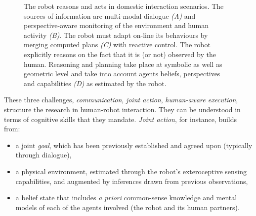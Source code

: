 \documentclass[preprint,3p,times]{elsarticle}
\begin{document}
\begin{figure}[htb]
\centering
{}

\caption{The robot reasons and acts in domestic interaction scenarios.  The
    sources of information are multi-modal dialogue {\it (A)} and
    perspective-aware monitoring of the environment and human activity {\it
    (B)}. The robot must adapt on-line its behaviours by merging computed plans
    {\it (C)} with reactive control. The robot explicitly reasons on the fact
    that it is (or not) observed by the human. Reasoning and planning take place
    at symbolic as well as geometric level and take into account agents beliefs,
    perspectives and capabilities {\it (D)} as estimated by the robot.}

\label{fig:hri-dec}
\end{figure}

These three challenges, \emph{communication}, \emph{joint action},
\emph{human-aware execution}, structure the research in human-robot
interaction. They can be understood in terms of cognitive skills that they
mandate. \emph{Joint action}, for instance, builds from:

\begin {itemize}
    \item a joint \emph{goal}, which has been previously established and agreed
        upon (typically through dialogue),
    
    \item a physical environment, estimated through the robot's exteroceptive
        sensing capabilities, and augmented by inferences drawn from previous
        observations,
    
    \item a belief state that includes {\it a priori} common-sense knowledge and
        mental models of each of the agents involved (the robot and its human partners).

\end {itemize}
\end{document}
